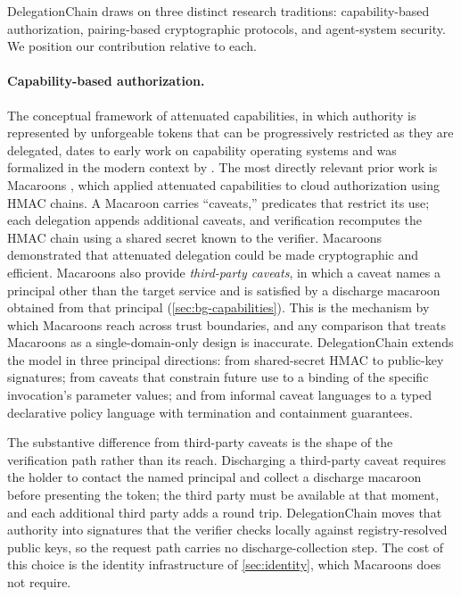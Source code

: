 \documentclass[11pt,a4paper]{article}
\begin{document}
DelegationChain draws on three distinct research traditions:
capability-based authorization, pairing-based cryptographic protocols,
and agent-system security. We position our contribution relative to
each.

\paragraph{Capability-based authorization.}
The conceptual framework of attenuated capabilities, in which authority
is represented by unforgeable tokens that can be progressively
restricted as they are delegated, dates to early work on capability
operating systems and was formalized in the modern context by
\citet{miller2006robust}. The most directly relevant prior work is
Macaroons \citep{birgisson2014macaroons}, which applied attenuated
capabilities to cloud authorization using HMAC chains. A Macaroon
carries ``caveats,'' predicates that restrict its use; each delegation
appends additional caveats, and verification recomputes the HMAC chain
using a shared secret known to the verifier. Macaroons demonstrated
that attenuated delegation could be made cryptographic and efficient.
Macaroons also provide \emph{third-party caveats}, in which a caveat
names a principal other than the target service and is satisfied by a
discharge macaroon obtained from that principal
(\cref{sec:bg-capabilities}). This is the mechanism by which Macaroons
reach across trust boundaries, and any comparison that treats Macaroons
as a single-domain-only design is inaccurate. DelegationChain extends
the model in three principal directions: from shared-secret HMAC to
public-key signatures; from caveats that constrain future use to a
binding of the specific invocation's parameter values; and from informal
caveat languages to a typed declarative policy language with termination
and containment guarantees.

The substantive difference from third-party caveats is the shape of the
verification path rather than its reach. Discharging a third-party
caveat requires the holder to contact the named principal and collect a
discharge macaroon before presenting the token; the third party must be
available at that moment, and each additional third party adds a round
trip. DelegationChain moves that authority into signatures that the
verifier checks locally against registry-resolved public keys, so the
request path carries no discharge-collection step. The cost of this
choice is the identity infrastructure of \cref{sec:identity}, which
Macaroons does not require.
\end{document}
